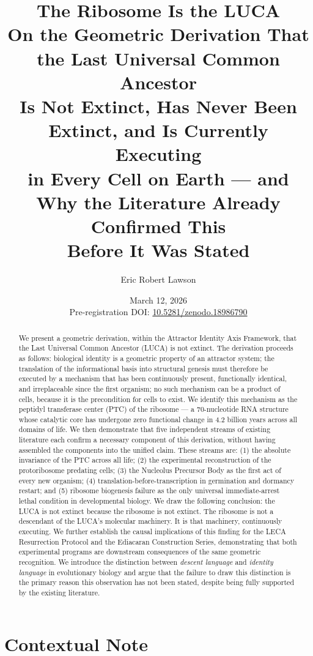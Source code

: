 \documentclass[11pt]{article}
\title{\textbf{The Ribosome Is the LUCA}\\[0.4em]
\large On the Geometric Derivation That the Last Universal Common Ancestor\\
Is Not Extinct, Has Never Been Extinct, and Is Currently Executing\\
in Every Cell on Earth — and Why the Literature Already Confirmed This\\
Before It Was Stated}
\author{Eric Robert Lawson}
\affil{OrganismCore --- Independent Research Initiative\\
ORCID: 0009-0002-0414-6544}
\date{March 12, 2026\\[0.3em]
\small Pre-registration DOI: \href{https://doi.org/10.5281/zenodo.18986790}{10.5281/zenodo.18986790}}
\theoremstyle{definition}
\begin{document}
\maketitle

\begin{abstract}
We present a geometric derivation, within the Attractor Identity Axis Framework,
that the Last Universal Common Ancestor (LUCA) is not extinct.
The derivation proceeds as follows:
biological identity is a geometric property of an attractor system;
the translation of the informational basis into structural genesis must therefore
be executed by a mechanism that has been continuously present, functionally
identical, and irreplaceable since the first organism;
no such mechanism can be a product of cells, because it is the precondition
for cells to exist.
We identify this mechanism as the peptidyl transferase center (PTC) of the
ribosome --- a 70-nucleotide RNA structure whose catalytic core has undergone
zero functional change in 4.2 billion years across all domains of life.
We then demonstrate that five independent streams of existing literature
each confirm a necessary component of this derivation, without having assembled
the components into the unified claim.
These streams are: (1) the absolute invariance of the PTC across all life;
(2) the experimental reconstruction of the protoribosome predating cells;
(3) the Nucleolus Precursor Body as the first act of every new organism;
(4) translation-before-transcription in germination and dormancy restart;
and (5) ribosome biogenesis failure as the only universal immediate-arrest
lethal condition in developmental biology.
We draw the following conclusion: the LUCA is not extinct because the ribosome
is not extinct. The ribosome is not a descendant of the LUCA's molecular
machinery. It is that machinery, continuously executing.
We further establish the causal implications of this finding for the
LECA Resurrection Protocol and the Ediacaran Construction Series,
demonstrating that both experimental programs are downstream consequences
of the same geometric recognition.
We introduce the distinction between \emph{descent language} and
\emph{identity language} in evolutionary biology and argue that
the failure to draw this distinction is the primary reason this
observation has not been stated, despite being fully supported by
the existing literature.
\end{abstract}

\tableofcontents

\newpage

\section*{Contextual Note}
\end{document}
